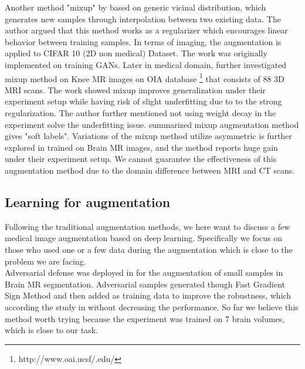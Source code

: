 Another method "mixup" by \cite{zhang_mixup_2018} based on generic vicinal distribution, which generates new samples through interpolation between two existing data. The author argued that this method works as a regularizer which encourages linear behavior between training samples. In terms of imaging, the augmentation is applied to CIFAR 10 (2D non medical) Dataset.
The work was originally implemented on training GANs. Later in medical domain, \cite{panfilov_improving_2019} further investigated mixup method on Knee MR images on OIA database \footnote{http://www.oai.ucsf/.edu/} that consists of 88 3D MRI scans. The work showed mixup improves generalization under their experiment setup while having risk of slight underfitting due to to the strong regularization. The author further mentioned not using weight decay in the experiment solve the underfitting issue.
\cite{tajbakhsh_embracing_2020} summarized mixup augmentation method gives "soft labels". Variations of the mixup method utilize asymmetric is further explored in \cite{li_overfitting_2019} trained on Brain MR images, and the method reports huge gain under their experiment setup.
We cannot guarantee the effectiveness of this augmentation method due to the domain difference between MRI and CT scans.

\subsection{Learning for augmentation}
Following the traditional augmentation methods, we here want to discuss a few medical image augmentation based on deep learning. Specifically we focus on those who used one or a few data during the augmentation which is close to the problem we are facing.\\

Adversarial defense was deployed in \cite{suk_brain_2019} for the augmentation of small samples in Brain MR segmentation. Adversarial samples generated though Fast Gradient Sign Method\cite{} and then added as training data to improve the robustness, which according the study in \cite{} without decreasing the performance. So far we believe this method worth trying because the experiment was trained on 7 brain volumes, which is close to our task.\\


